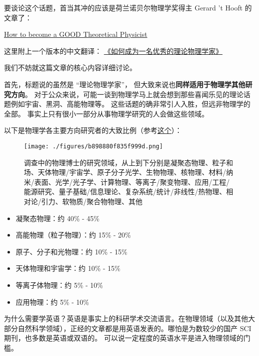 
要谈论这个话题，首当其冲的应该是荷兰诺贝尔物理学奖得主 Gerard 't Hooft 的文章了：

\href{https://webspace.science.uu.nl/~hooft101/theorist.html}{How to become a GOOD Theoretical Physicist}

这里附上一个版本的中文翻译： \href{https://xialab.pku.edu.cn/kytdyw1/zdylm.m.jsp?wbtreeid=1011&tstreeid=11956&_t_uid=2945&language=en&homepageuuid=BF649325C5584FC683CE0B601D21AC65&templateuuid=4CC182410BA14FF8B55ED726FB2087FB&producttype=0&_tmode_=99&tsitesapptype=zdylm}{《如何成为一名优秀的理论物理学家》}

我们不妨就这篇文章的核心内容详细讨论。

首先，标题说的虽然是 “理论物理学家”， 但大致来说也\textbf{同样适用于物理学其他研究方向}。 对于公众来说，可能一谈到物理学马上就会想到那些喜闻乐见的理论话题例如宇宙、黑洞、高能物理等。 这些话题的确非常引人入胜，但远非物理学的全部。 事实上只有很小一部分从事物理学研究的人会做这些领域。 

以下是物理学各主要方向研究者的大致比例（参考\href{https://ww2.aip.org/statistics/trends-in-physics-phds}{这个}）：

\begin{figure}[ht]
\centering
\texttt{[image: ./figures/b898880f835f999d.png]}
\caption{调查中的物理博士的研究领域，从上到下分别是凝聚态物理、粒子和场、天体物理/宇宙学、原子分子光学、生物物理、核物理、材料/纳米/表面、光学/光子学、计算物理、等离子/聚变物理、应用/工程/能源研究、量子基础/信息理论、复杂系统/统计/非线性/热物理、相对论/引力、软物质/聚合物物理、其他} \label{fig_SdyPhy_1}
\end{figure}

\begin{itemize}
\item 凝聚态物理：约 40\% - 45\%
\item 高能物理（粒子物理）：约 15\% - 20\%
\item 原子、分子和光物理：约 10\% - 15\%
\item 天体物理和宇宙学：约 10\% - 15\%
\item 等离子体物理：约 5\% - 10\%
\item 应用物理：约 5\% - 10\%
\end{itemize}


为什么需要学英语？英语是事实上的科研学术交流语言。在物理领域（以及其他大部分自然科学领域），正经的文章都是用英语发表的。哪怕是为数较少的国产 SCI 期刊，也多数是英语或双语的。 可以说一定程度的英语水平是进入物理领域的门槛。


